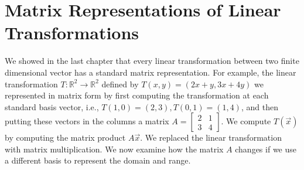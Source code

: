 













 
\section{Matrix Representations of Linear Transformations}
We showed in the last chapter that every linear transformation between two finite dimensional vector has a standard matrix representation.  
For example, the linear transformation $T\colon {\mathbb{R}}^2 \to {\mathbb{R}}^2$ defined by $T(x,y)=(2x+y,3x+4y)$ we represented in matrix form by first computing the transformation at each standard basis vector, i.e., $T(1,0)=(2,3), T(0,1)=(1,4)$, and then putting these vectors in the columns a matrix 
$A= \begin{bmatrix}2&1\\3&4\end{bmatrix}$. 
We compute $T(\vec x)$ by computing the matrix product $A\vec x$.  We replaced the linear transformation with matrix multiplication. We now examine how the matrix $A$ changes if we use a different basis to represent the domain and range.

